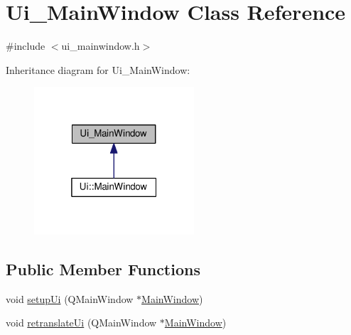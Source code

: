 \hypertarget{classUi__MainWindow}{}\section{Ui\+\_\+\+Main\+Window Class Reference}
\label{classUi__MainWindow}


{\ttfamily \#include $<$ui\+\_\+mainwindow.\+h$>$}



Inheritance diagram for Ui\+\_\+\+Main\+Window\+:
\nopagebreak
\begin{figure}[H]
\begin{center}
\leavevmode
\includegraphics[width=169pt]{classUi__MainWindow__inherit__graph}
\end{center}
\end{figure}
\subsection*{Public Member Functions}
\begin{DoxyCompactItemize}
\item 
void \hyperlink{classUi__MainWindow_acf4a0872c4c77d8f43a2ec66ed849b58}{setup\+Ui} (Q\+Main\+Window $\ast$\hyperlink{classMainWindow}{Main\+Window})
\item 
void \hyperlink{classUi__MainWindow_a097dd160c3534a204904cb374412c618}{retranslate\+Ui} (Q\+Main\+Window $\ast$\hyperlink{classMainWindow}{Main\+Window})
\end{DoxyCompactItemize}
